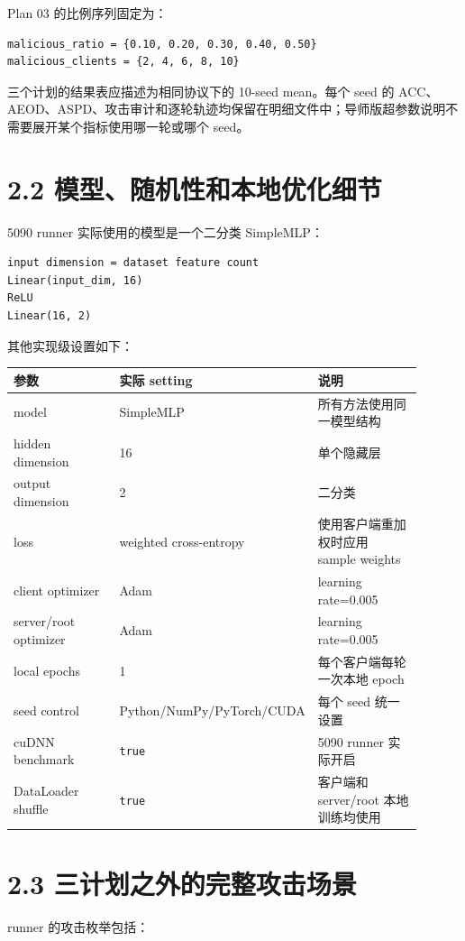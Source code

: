 \documentclass[UTF8,a4paper,10pt]{ctexart}
\begin{document}
Plan 03 的比例序列固定为：

\begin{lstlisting}
malicious_ratio = {0.10, 0.20, 0.30, 0.40, 0.50}
malicious_clients = {2, 4, 6, 8, 10}
\end{lstlisting}
三个计划的结果表应描述为相同协议下的 10-seed mean。每个 seed 的 ACC、AEOD、ASPD、攻击审计和逐轮轨迹均保留在明细文件中；导师版超参数说明不需要展开某个指标使用哪一轮或哪个 seed。

\section{2.2 模型、随机性和本地优化细节}
5090 runner 实际使用的模型是一个二分类 SimpleMLP：

\begin{lstlisting}
input dimension = dataset feature count
Linear(input_dim, 16)
ReLU
Linear(16, 2)
\end{lstlisting}
其他实现级设置如下：

{\small
\renewcommand{\arraystretch}{1.18}
\begin{longtable}{|p{0.300\linewidth}|p{0.300\linewidth}|p{0.300\linewidth}|}
\hline
参数 & 实际 setting & 说明 \\\hline
\endhead
model & SimpleMLP & 所有方法使用同一模型结构 \\\hline
hidden dimension & 16 & 单个隐藏层 \\\hline
output dimension & 2 & 二分类 \\\hline
loss & weighted cross-entropy & 使用客户端重加权时应用 sample weights \\\hline
client optimizer & Adam & learning rate=0.005 \\\hline
server/root optimizer & Adam & learning rate=0.005 \\\hline
local epochs & 1 & 每个客户端每轮一次本地 epoch \\\hline
seed control & Python/NumPy/PyTorch/CUDA & 每个 seed 统一设置 \\\hline
cuDNN benchmark & \texttt{true} & 5090 runner 实际开启 \\\hline
DataLoader shuffle & \texttt{true} & 客户端和 server/root 本地训练均使用 \\\hline
\end{longtable}
}
\section{2.3 三计划之外的完整攻击场景}
runner 的攻击枚举包括：
\end{document}
